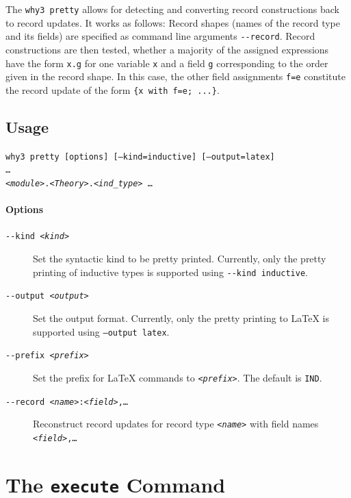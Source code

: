 The \texttt{why3 pretty} allows for detecting and converting record
constructions back to record updates. It works as follows: Record shapes
(names of the record type and its fields) are specified as command line
arguments \texttt{-{}-record}. Record constructions are then tested,
whether a majority of the assigned expressions have the form
\texttt{x.g} for one variable \texttt{x} and a field \texttt{g}
corresponding to the order given in the record shape. In this case, the
other field assignments \texttt{f=e} constitute the record update of the
form \texttt{\{x with f=e; ...\}}.

\subsection*{Usage}

\texttt{why3 pretty [options] [--kind=inductive] [--output=latex]\\
 \ldots{}\\
\indent \textsl{<module>}.\textsl{<Theory>}.\textsl{<ind\_type>} \ldots}

\paragraph{Options}

\begin{description}
\item[\texttt{-{}-kind~\textsl{<kind>}}] Set the syntactic kind to be
  pretty printed. Currently, only the pretty printing of inductive types
  is supported using \texttt{-{}-kind inductive}.
\item[\texttt{-{}-output~\textsl{<output>}}] Set the output format.
  Currently, only the pretty printing to \LaTeX{} is supported using
  \texttt{--output latex}.
\item[\texttt{-{}-prefix~\textsl{<prefix>}}] Set the prefix for \LaTeX{}
  commands to \texttt{\textsl{<prefix>}}. The default is \texttt{IND}.
\item[\texttt{-{}-record~\textsl{<name>}:\textsl{<field>},\ldots}]
  Reconstruct record updates for record type \texttt{\textsl{<name>}}
  with field names \texttt{\textsl{<field>},\ldots}
\end{description}

\section{The \texttt{execute} Command}
\label{sec:why3execute}

